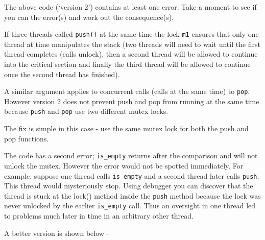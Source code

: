 The above code (`version 2') contains at least one error. Take a moment
to see if you can the error(s) and work out the consequence(s).

If three threads called \texttt{push()} at the same time the lock
\texttt{m1} ensures that only one thread at time manipulates the stack
(two threads will need to wait until the first thread completes (calls
unlock), then a second thread will be allowed to continue into the
critical section and finally the third thread will be allowed to
continue once the second thread has finished).

A similar argument applies to concurrent calls (calls at the same time)
to \texttt{pop}. However version 2 does not prevent push and pop from
running at the same time because \texttt{push} and \texttt{pop} use two
different mutex locks.

The fix is simple in this case - use the same mutex lock for both the
push and pop functions.

The code has a second error; \texttt{is\_empty} returns after the
comparison and will not unlock the mutex. However the error would not be
spotted immediately. For example, suppose one thread calls
\texttt{is\_empty} and a second thread later calls \texttt{push}. This
thread would mysteriously stop. Using debugger you can discover that the
thread is stuck at the lock() method inside the \texttt{push} method
because the lock was never unlocked by the earlier \texttt{is\_empty}
call. Thus an oversight in one thread led to problems much later in time
in an arbitrary other thread.

A better version is shown below -

\begin{Shaded}
\begin{Highlighting}[]
 
 

  
\NormalTok{\}}
 
   
   
\NormalTok{\}}
 
   \NormalTok{;}
   
\NormalTok{\}}
\end{Highlighting}
\end{Shaded}

